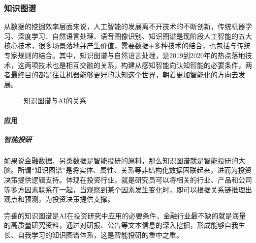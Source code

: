 \documentclass[letterpaper,11pt,english]{sphinxmanual}
\begin{document}
\subsubsection{知识图谱}
\label{\detokenize{chapter_AI_dive/knowledge_map:id1}}\label{\detokenize{chapter_AI_dive/knowledge_map::doc}}
从数据的挖掘效率层面来说，人工智能的发展离不开技术的不断创新，传统机器学习、深度学习、自然语言处理、语音图像识别、知识图谱是现阶段人工智能的五大核心技术，很多场景落地并产生价值，需要数据+多种技术的结合，也包括与传统专家规则的结合。其中，知识图谱与自然语言处理，是2019到2020年的热点落地技术，这两项技术也是相互交融的关系，构建从感知智能向认知智能的必要条件，两者最终目的都是往让机器能够更好的认知这个世界，朝着更加智能化的方向去发展。%
\begin{footnote}[855]\sphinxAtStartFootnote
{}
%
\end{footnote}

\begin{figure}[H]
\centering
\capstart

\noindent{}
\caption{知识图谱与AI的关系}\label{\detokenize{chapter_AI_dive/knowledge_map:id4}}\end{figure}


\paragraph{应用}
\label{\detokenize{chapter_AI_dive/knowledge_map:id2}}

\subparagraph{智能投研}
\label{\detokenize{chapter_AI_dive/knowledge_map:id3}}
如果说金融数据、另类数据是智能投研的原料，那么知识图谱就是智能投研的大脑。所谓“知识图谱”是将实体、属性、关系等非结构化数据固联起来，进而为投资决策提供逻辑支持。体现在投资行业，就是研究员可以将相关的行业、产品和公司等多方因素联系在一起，当观察到某个因素发生变化时，即可以根据关系链推理出观点和预测，为投资决策提供支撑。

完善的知识图谱是AI在投资研究中应用的必要条件，金融行业最不缺的就是海量的高质量研究资料，通过对研报、公告等文本信息的深入挖掘，形成能够自我生长、自我学习的知识图谱体系，这是智能投研的重中之重。%
\begin{footnote}[856]\sphinxAtStartFootnote
{}
%
\end{footnote}
\end{document}
